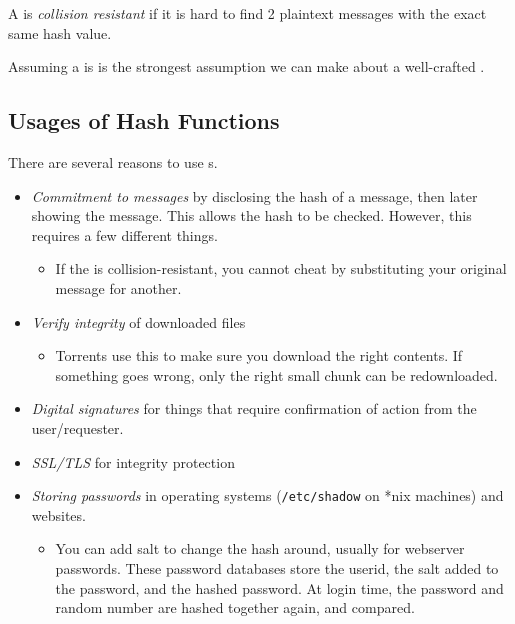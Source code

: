 \begin{definition}\label{def:Collision_Resistant}
  A  is \emph{collision resistant} if it is hard to find 2 plaintext messages with the exact same hash value.

  \begin{remark}\label{rmk:Collision_Resistant_Assumption}
    Assuming a  is  is the strongest assumption we can make about a well-crafted .
  \end{remark}
\end{definition}

\subsection{Usages of Hash Functions}\label{subsec:Hash_Functions_Usages}
There are several reasons to use s.
\begin{itemize}[noitemsep]
\item \emph{Commitment to messages} by disclosing the hash of a message, then later showing the message. This allows the hash to be checked. However, this requires a few different things.
  \begin{itemize}[noitemsep]
  \item If the  is collision-resistant, you cannot cheat by substituting your original message for another.
  \end{itemize}
\item \emph{Verify integrity} of downloaded files
  \begin{itemize}[noitemsep]
  \item Torrents use this to make sure you download the right contents. If something goes wrong, only the right small chunk can be redownloaded.
  \end{itemize}
\item \emph{Digital signatures} for things that require confirmation of action from the user/requester.
\item \emph{SSL/TLS} for integrity protection
\item \emph{Storing passwords} in operating systems (\texttt{/etc/shadow} on *nix machines) and websites.
  \begin{itemize}[noitemsep]
  \item You can add salt to change the hash around, usually for webserver passwords. These password databases store the userid, the salt added to the password, and the hashed password. At login time, the password and random number are hashed together again, and compared.
  \end{itemize}
\end{itemize}


